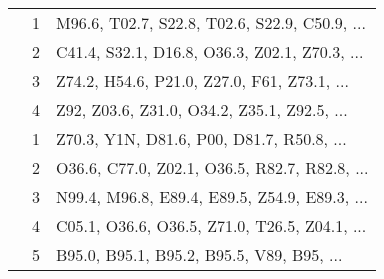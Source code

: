 \begin{table}[htbp]
\begin{tabularx}{\textwidth}{c c X}
	\addlinespace
	7 & 1 & M96.6, T02.7, S22.8, T02.6, S22.9, C50.9, ... \\
	 & 2 & C41.4, S32.1, D16.8, O36.3, Z02.1, Z70.3, ... \\
	 & 3 & Z74.2, H54.6, P21.0, Z27.0, F61, Z73.1, ... \\
	 & 4 & Z92, Z03.6, Z31.0, O34.2, Z35.1, Z92.5, ... \\
	\addlinespace
	8 & 1 & Z70.3, Y1N, D81.6, P00, D81.7, R50.8, ... \\
	 & 2 & O36.6, C77.0, Z02.1, O36.5, R82.7, R82.8, ... \\
	 & 3 & N99.4, M96.8, E89.4, E89.5, Z54.9, E89.3, ... \\
	 & 4 & C05.1, O36.6, O36.5, Z71.0, T26.5, Z04.1, ... \\
	 & 5 & B95.0, B95.1, B95.2, B95.5, V89, B95, ... \\
	\bottomrule
\end{tabularx}
\end{table}


